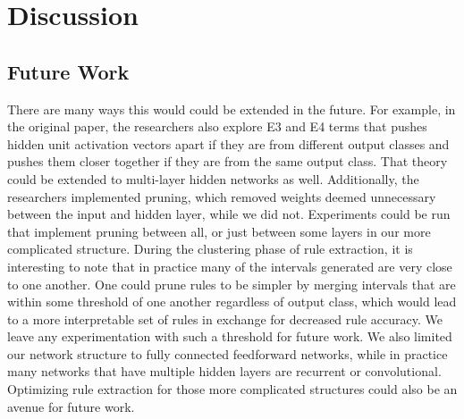 \section{Discussion}
\label{sec:discussion}

\subsection{Future Work}
\label{sec:futurework}
There are many ways this would could be extended in the future. For
example, in the original paper, the researchers also explore E3 and E4
terms that pushes hidden unit activation vectors apart if they are from different
output classes and pushes them closer together if they are from the
same output class. That theory could be extended to multi-layer hidden
networks as well. Additionally, the researchers implemented pruning,
which removed weights deemed unnecessary between the input and hidden
layer, while we did not. Experiments could be run that implement
pruning between all, or just between some layers in our more
complicated structure. During the clustering phase of rule extraction, it
is interesting to note that in practice many of the intervals generated are very close
to one another. One could prune rules to be simpler by merging
intervals that are within some threshold of one another regardless of
output class, which would lead to a more interpretable set of rules in exchange for decreased
rule accuracy. We leave any experimentation with such a threshold for
future work. We also limited our network structure to fully
connected feedforward networks, while in practice many networks that
have multiple hidden layers are recurrent or convolutional. Optimizing
rule extraction for those more complicated structures could also be an
avenue for future work. 

